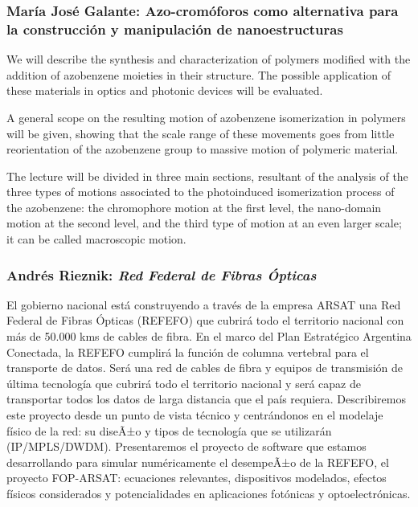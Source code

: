 \subsubsection*{Mar\'ia Jos\'e Galante: Azo-crom\'oforos como alternativa para
la construcci\'on y manipulaci\'on de nanoestructuras}

We will describe the synthesis and characterization of polymers modified with
the addition of azobenzene moieties in their structure. The possible application
of these materials in optics and photonic devices will be evaluated.

A general scope on the resulting motion of azobenzene isomerization in polymers
will be given, showing that the scale range of these movements goes from little
reorientation of the azobenzene group to massive motion of polymeric material.

The lecture will be divided in three main sections, resultant of the analysis of
the three types of motions associated to the photoinduced isomerization process
of the azobenzene: the chromophore motion at the first level, the nano-domain
motion at the second level, and the third type of motion at an even larger
scale; it can be called macroscopic motion.

\subsubsection*{Andr\'es Rieznik: \textit{Red Federal de Fibras \'Opticas}}

El gobierno nacional est\'a construyendo a trav\'es de la empresa ARSAT una Red
Federal de Fibras \'Opticas (REFEFO) que cubrir\'a todo el territorio nacional
con m\'as de 50.000 kms de cables de fibra. En el marco del Plan Estrat\'egico
Argentina Conectada, la REFEFO cumplir\'a la funci\'on de columna vertebral para
el transporte de datos. Ser\'a una red de cables de fibra y equipos de
transmisi\'on de \'ultima tecnolog\'ia que cubrir\'a todo el territorio nacional
y ser\'a capaz de transportar todos los datos de larga distancia que el pa\'is
requiera. Describiremos este proyecto desde un punto de vista t\'ecnico y
centr\'andonos en el modelaje f\'isico de la red: su diseÃ±o y tipos de
tecnolog\'ia que se utilizar\'an (IP/MPLS/DWDM). Presentaremos el proyecto de
software que estamos desarrollando para simular num\'ericamente el desempeÃ±o de
la REFEFO, el proyecto FOP-ARSAT: ecuaciones relevantes, dispositivos modelados,
efectos f\'isicos considerados y potencialidades en aplicaciones fot\'onicas y
optoelectr\'onicas.

